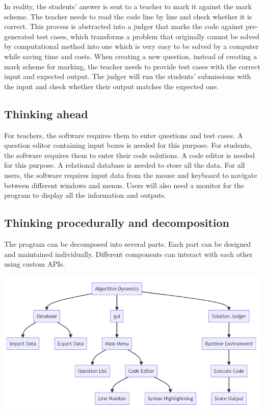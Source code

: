 \documentclass[a4paper]{report}
\begin{document}
In reality, the students' answer is sent to a teacher to mark it against the mark scheme. The teacher needs to read the code line by line and check whether it is correct. This process is abstracted into a judger that marks the code against pre-generated test cases, which transforms a problem that originally cannot be solved by computational method into one which is very easy to be solved by a computer while saving time and costs. When creating a new question, instead of creating a mark scheme for marking, the teacher needs to provide test cases with the correct input and expected output. The judger will run the students' submissions with the input and check whether their output matches the expected one.

\subsection{Thinking ahead}

For teachers, the software requires them to enter questions and test cases. A question editor containing input boxes is needed for this purpose. For students, the software requires them to enter their code solutions. A code editor is needed for this purpose. A relational database is needed to store all the data. For all users, the software requires input data from the mouse and keyboard to navigate between different windows and menus. Users will also need a monitor for the program to display all the information and outputs.

\subsection{Thinking procedurally and decomposition}

The program can be decomposed into several parts. Each part can be designed and maintained individually. Different components can interact with each other using custom APIs.

\includegraphics[width=\linewidth]{decomposition-analysis}
\end{document}
